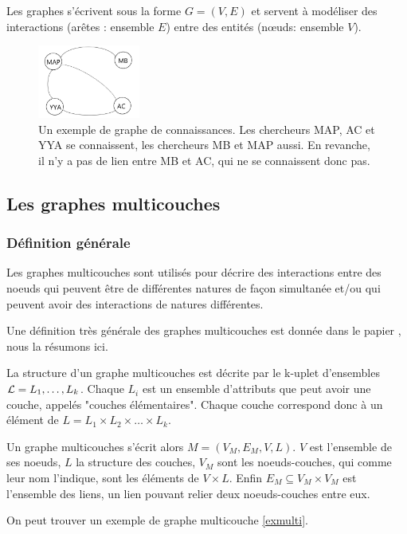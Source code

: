 \documentclass[11pt,a4paper]{article}
\theoremstyle{definition}
\theoremstyle{remark}
\theoremstyle{remark}
\begin{document}
Les graphes s'écrivent sous la forme $G=(V,E)$ et servent à modéliser des interactions (arêtes : ensemble $E$) entre des entités (nœuds: ensemble $V$). 

\begin{figure}[H]
	\centering
	\includegraphics[width=0.3\textwidth]{exGraphe.JPG}
	\caption{Un exemple de graphe de connaissances. Les chercheurs MAP, AC et YYA se connaissent, les chercheurs MB et MAP aussi. En revanche, il n'y a pas de lien entre MB et AC, qui ne se connaissent donc pas.}
\end{figure}


\subsection{Les graphes multicouches}

\subsubsection{Définition générale}

 Les graphes multicouches sont utilisés pour décrire des interactions entre des noeuds qui peuvent être de différentes natures de façon simultanée et/ou qui peuvent avoir des interactions de natures différentes. 
 
 Une définition très générale des graphes multicouches est donnée dans le papier \cite{mlkiv}, nous la résumons ici.
 
 La structure d'un graphe multicouches est décrite par le k-uplet d'ensembles ${\cal L} = L_1, \dots , L_k$. Chaque $L_i$ est un ensemble d'attributs que peut avoir une couche, appelés "couches élémentaires". Chaque couche correspond donc à un élément de $L=L_1\times L_2 \times \dots \times L_k$.
 
 Un graphe multicouches s'écrit alors $M = (V_M, E_M, V, L)$. $V$ est l'ensemble de ses noeuds, $L$ la structure des couches, $V_M$ sont les noeuds-couches, qui comme leur nom l'indique, sont les éléments de $V\times L$. Enfin $E_M \subseteq V_M \times V_M $ est l'ensemble des liens, un lien pouvant relier deux noeuds-couches entre eux. 
 
 On peut trouver un exemple de graphe multicouche \cref{exmulti}.
\end{document}
